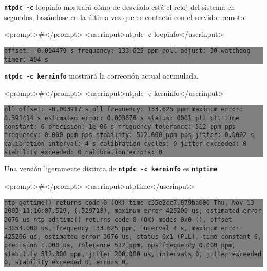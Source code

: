 	


\texttt{\textbf{ntpdc -c}} loopinfo mostrará cómo de desviado está el reloj del sistema
en segundos, basándose en la última vez que se contactó con el servidor 
remoto.



<prompt>#</prompt> <userinput>ntpdc -c loopinfo</userinput>
\colorbox{grey}{\parbox[t]{0.95\linewidth}{ \vspace*{0.5cm} {\tt offset:               -0.004479 s
frequency:            133.625 ppm
poll adjust:          30
watchdog timer:       404 s
 } \vspace*{0.5cm} } } 

	

	\texttt{\textbf{ntpdc -c kerninfo}}  mostrará la corrección actual acumulada.


<prompt>#</prompt> <userinput>ntpdc -c kerninfo</userinput>
\colorbox{grey}{\parbox[t]{0.95\linewidth}{ \vspace*{0.5cm} {\tt pll offset:           -0.003917 s
pll frequency:        133.625 ppm
maximum error:        0.391414 s
estimated error:      0.003676 s
status:               0001  pll
pll time constant:    6
precision:            1e-06 s
frequency tolerance:  512 ppm
pps frequency:        0.000 ppm
pps stability:        512.000 ppm
pps jitter:           0.0002 s
calibration interval: 4 s
calibration cycles:   0
jitter exceeded:      0
stability exceeded:   0
calibration errors:   0
 } \vspace*{0.5cm} } } 

	

	
	
	
Una versión ligeramente distinta de \texttt{\textbf{ntpdc -c kerninfo}} es \texttt{\textbf{ntptime}}


<prompt>#</prompt> <userinput>ntptime</userinput>
\colorbox{grey}{\parbox[t]{0.95\linewidth}{ \vspace*{0.5cm} {\tt ntp_gettime() returns code 0 (OK)
  time c35e2cc7.879ba000  Thu, Nov 13 2003 11:16:07.529, (.529718),
  maximum error 425206 us, estimated error 3676 us
ntp_adjtime() returns code 0 (OK)
  modes 0x0 (),
  offset -3854.000 us, frequency 133.625 ppm, interval 4 s,
  maximum error 425206 us, estimated error 3676 us,
  status 0x1 (PLL),
  time constant 6, precision 1.000 us, tolerance 512 ppm,
  pps frequency 0.000 ppm, stability 512.000 ppm, jitter 200.000 us,
  intervals 0, jitter exceeded 0, stability exceeded 0, errors 0.
 } \vspace*{0.5cm} } } 

